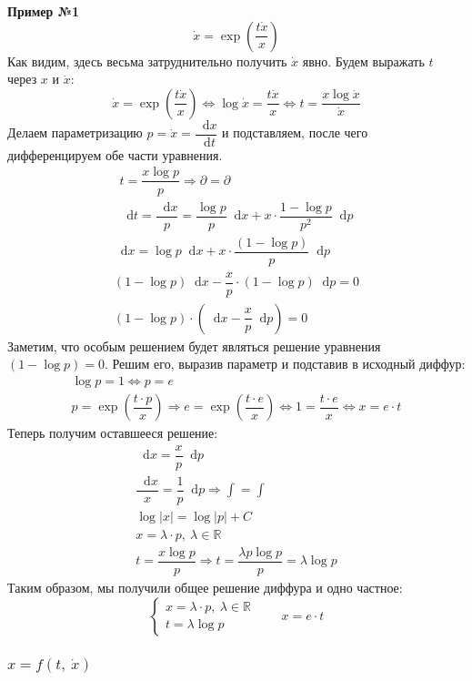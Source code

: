 \documentclass[a4paper,12pt]{article}
\newcommand{\R}{\mathbb{R}}
\renewcommand*\d{\mathop{}\!\mathrm{d}}
\newcommand{\dx}{\dot{x}}
\newcommand{\bto}{\Longrightarrow}
\newcommand{\ds}{\displaystyle}
\begin{document}
\textbf{Пример №1}
\[\dx = \exp(\dfrac{t\dx}{x})\]
Как видим, здесь весьма затруднительно получить $\dx$ явно. Будем выражать $t$ через $x$ и $\dx$:
\[\dx = \exp(\dfrac{t\dx}{x}) \iff \log \dx = \dfrac{t\dx}{x} \iff t = \dfrac{x \log \dx }{\dx}\]
Делаем параметризацию $p = \dx = \dfrac{\d x}{\d t}$ и подставляем, после чего дифференцируем обе части уравнения.
\begin{gather*}
	t = \dfrac{x \log p }{p} \bto \partial = \partial\\
	\d t = \dfrac{\d x}{p} = \dfrac{\log p}{p}\d x + x \cdot \dfrac{1 - \log p}{p^2}\d p
\end{gather*}
\begin{gather*}
	\d x = \log p \d x + x\cdot \dfrac{(1 - \log p)}{p}\d p\\
	(1 - \log p)\d x - \dfrac{x}{p} \cdot (1 - \log p)\d p = 0\\
	(1 - \log p)\cdot \left(\d x - \dfrac{x}{p}\d p\right) = 0
\end{gather*}
Заметим, что особым решением будет являться решение уравнения $(1 - \log p) = 0$. Решим его, выразив параметр и подставив в исходный диффур:
\begin{gather*}
	\log p = 1 \iff p = e\\
	p = \exp(\dfrac{t \cdot p}{x}) \bto e = \exp(\dfrac{t \cdot e}{x}) \iff 1 = \dfrac{t \cdot e}{x} \iff x = e \cdot t
\end{gather*}
Теперь получим оставшееся решение:
\begin{gather}
	\d x = \dfrac{x}{p}\d p\\
	\dfrac{\d x}{x} = \dfrac{1}{p}\d p \bto \ds \int = \int\\
	\log|x| = \log|p| + C\\
	x = \lambda\cdot p,\ \lambda \in \R\\
	t = \dfrac{x \log p }{p} \bto t = \dfrac{\lambda p \log p}{p} = \lambda\log p
\end{gather}
Таким образом, мы получили общее решение диффура и одно частное:
\[\begin{cases}
	x = \lambda\cdot p,\ \lambda \in \R\\
	t = \lambda\log p
\end{cases} \qquad x = e \cdot t\]


\subsubsection{$x = f(t,\ \dx)$}
\end{document}
